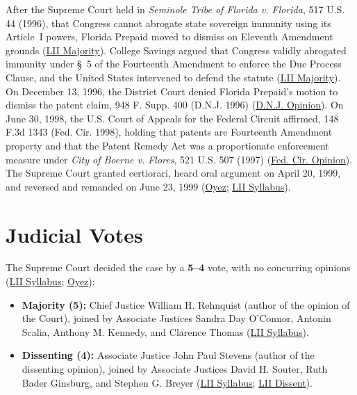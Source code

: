 \documentclass[12pt]{article}
\begin{document}
After the Supreme Court held in \textit{Seminole Tribe of Florida v. Florida}, 517 U.S. 44 (1996), that Congress cannot abrogate state sovereign immunity using its Article~I powers, Florida Prepaid moved to dismiss on Eleventh Amendment grounds (\href{https://www.law.cornell.edu/supct/html/98-531.ZO.html}{LII Majority}). College Savings argued that Congress validly abrogated immunity under \S~5 of the Fourteenth Amendment to enforce the Due Process Clause, and the United States intervened to defend the statute (\href{https://www.law.cornell.edu/supct/html/98-531.ZO.html}{LII Majority}). On December 13, 1996, the District Court denied Florida Prepaid's motion to dismiss the patent claim, 948 F. Supp. 400 (D.N.J. 1996) (\href{https://law.justia.com/cases/federal/district-courts/FSupp/948/400/2098999/}{D.N.J. Opinion}). On June 30, 1998, the U.S. Court of Appeals for the Federal Circuit affirmed, 148 F.3d 1343 (Fed. Cir. 1998), holding that patents are Fourteenth Amendment property and that the Patent Remedy Act was a proportionate enforcement measure under \textit{City of Boerne v. Flores}, 521 U.S. 507 (1997) (\href{https://law.justia.com/cases/federal/fed-cir/1998/148-f3d-1343.html}{Fed. Cir. Opinion}). The Supreme Court granted certiorari, heard oral argument on April 20, 1999, and reversed and remanded on June 23, 1999 (\href{https://www.oyez.org/cases/1998/98-531}{Oyez}; \href{https://www.law.cornell.edu/supct/html/98-531.ZS.html}{LII Syllabus}).

\section{Judicial Votes}

The Supreme Court decided the case by a \textbf{5--4} vote, with no concurring opinions (\href{https://www.law.cornell.edu/supct/html/98-531.ZS.html}{LII Syllabus}; \href{https://www.oyez.org/cases/1998/98-531}{Oyez}):

\begin{itemize}
\item \textbf{Majority (5):} Chief Justice William H. Rehnquist (author of the opinion of the Court), joined by Associate Justices Sandra Day O'Connor, Antonin Scalia, Anthony M. Kennedy, and Clarence Thomas (\href{https://www.law.cornell.edu/supct/html/98-531.ZS.html}{LII Syllabus}).
\item \textbf{Dissenting (4):} Associate Justice John Paul Stevens (author of the dissenting opinion), joined by Associate Justices David H. Souter, Ruth Bader Ginsburg, and Stephen G. Breyer (\href{https://www.law.cornell.edu/supct/html/98-531.ZS.html}{LII Syllabus}; \href{https://www.law.cornell.edu/supct/html/98-531.ZD.html}{LII Dissent}).
\end{itemize}
\end{document}
